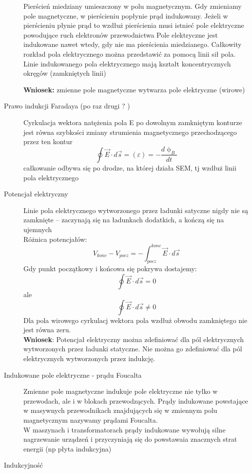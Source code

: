 \documentclass[a4paper,11pt]{article}
\begin{document}
\begin{description}
  Pierścień miedziany umieszczony w polu magnetycznym. Gdy zmieniamy pole magnetyczne, w pierścieniu popłynie prąd indukowany. Jeżeli w pierścieniu płynie prąd to wzdłuż pierścienia musi istnieć pole elektryczne powodujące ruch elektronów przewodnictwa Pole elektryczne jest indukowane nawet wtedy, gdy nie ma pierścienia miedzianego. Całkowity rozkład pola elektrycznego można przedstawić za pomocą linii sił pola. Linie indukowanego pola elektrycznego mają kształt koncentrycznych okręgów (zamkniętych linii)

  \textbf{Wniosek:} zmienne pole magnetyczne wytwarza pole elektryczne (wirowe)
\item[Prawo indukcji Faradaya (po raz drugi ? )]
  Cyrkulacja wektora natężenia pola E po dowolnym zamkniętym konturze jest równa szybkości zmiany strumienia magnetycznego przechodzącego przez ten kontur
  $$\oint\vec{E}\cdot d\vec{s} = (\varepsilon) = -\frac{d\upphi_B}{dt}$$
  całkowanie odbywa się po drodze, na której działa SEM, tj wzdłuż linii pola elektrycznego
\item[Potencjał elektryczny] 

  Linie pola elektrycznego wytworzonego przez ładunki satyczne nigdy nie są zamknięte -- zaczynają się na ładunkach dodatkich, a kończą się na ujemnych\\
  Różnica potencjałów:
  $$V_{konc} - V_{pocz} = -\int^{konc}_{pocz}\vec{E}\cdot d\vec{s}$$
  Gdy punkt początkowy i końcowa się pokrywa dostajemy:
  $$\oint \vec{E} \cdot d\vec{s} = 0$$ ale
  $$\oint\vec{E}\cdot d\vec{s}\not=0$$
  Dla pola wirowego cyrkulacj wektora pola wzdłuż obwodu zamkniętego nie jest równa zeru.\\
  \textbf{Wniosek}: Potencjał elektryczny można zdefiniować dla pól elektrycznych wytworzonych przez ładunki statyczne. Nie można go zdefiniować dla pól elektrycznych wytworzonych przez indukcję.
\item[Indukowane pole elektryczne - prądu Foucalta]

  Zmienne pole magnetyczne indukuje pole elektryczne nie tylko w przewodach, ale i w blokach przewodzących. Prądy indukowane powstające w masywnych przewodnikach znajdujących się w zmiennym polu magnetycznym nazywamy prądami Foucalta.\\
  W maszynach i transformatorach prądy indukowane wywołują silne nagrzewanie urządzeń i przyczyniają się do powstawaia znacznych strat energii (np płyta indukcyjna)
\item[Indukcyjność]


\end{description}
\end{document}
